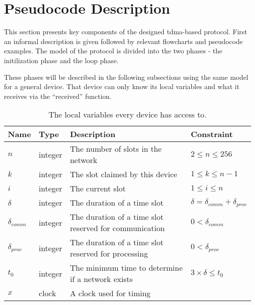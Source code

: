 \section{Pseudocode Description}\label{sec:Pseudo}
This section presents key components of the designed \gls{tdma}-based protocol. 
First an informal description is given followed by relevant flowcharts and pseudocode examples. 
The model of the protocol is divided into the two phases - the initilization phase and the loop phase. 

These phases will be described in the following subsections using the same model for a general device. 
That device can only know its local variables and what it receives via the \enquote{received} function.

\begin{table}[H]
    \begin{tabularx}{\textwidth}{l|l|X|l}
        \toprule
        Name                & Type      & Description & Constraint \\
        \midrule
        $n$                 & integer   & The number of slots in the network                        & $2 \leq n \leq 256$\\
        $k$                 & integer   & The slot claimed by this device                           & $1 \leq k \leq n - 1$\\
        $i$                 & integer   & The current slot                                          & $1 \leq i \leq n$\\
        $\delta$            & integer   & The duration of a time slot                               & $\delta = \delta_{comm} + \delta_{proc}$\\
        $\delta_{comm}$      & integer   & The duration of a time slot reserved for communication    & $0 < \delta_{comm}$ \\
        $\delta_{proc}$     & integer   & The duration of a time slot reserved for processing       & $0 < \delta_{proc}$ \\
        $t_0$               & integer   & The minimum time to determine if a network exists         & $3 \times \delta \leq t_0$ \\
        $x$                 & clock     & A clock used for timing\\
        \bottomrule
    \end{tabularx}
    \caption{The local variables every device has access to.}
    \label{tab:locals}
\end{table}

